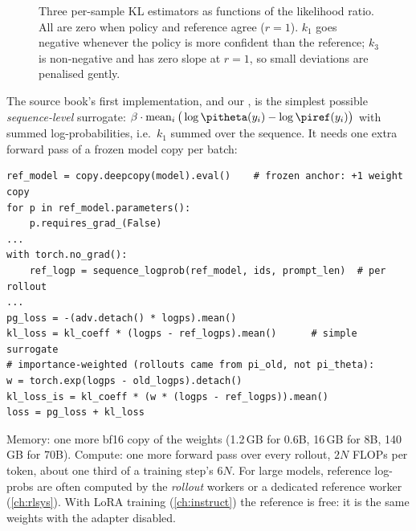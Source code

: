 \begin{figure}[ht]
\centering
{}
\caption{Three per-sample KL estimators as functions of the likelihood ratio. All are zero
when policy and reference agree ($r=1$). $k_1$ goes negative whenever the policy is more
confident than the reference; $k_3$ is non-negative and has zero slope at $r=1$, so small
deviations are penalised gently.}
\label{fig:grpo2:klest}
\end{figure}

The source book's first implementation, and our , is the
simplest possible \emph{sequence-level} surrogate: $\beta\cdot\operatorname{mean}_i\big(\log\pitheta(y_i)-\log\piref(y_i)\big)$
with summed log-probabilities, i.e.\ $k_1$ summed over the sequence. It needs one extra
forward pass of a frozen model copy per batch:

\begin{lstlisting}[caption={Adding a KL term (sequence surrogate and the importance-weighted variant).},label={lst:grpo2:kl}]
ref_model = copy.deepcopy(model).eval()    # frozen anchor: +1 weight copy
for p in ref_model.parameters():
    p.requires_grad_(False)
...
with torch.no_grad():
    ref_logp = sequence_logprob(ref_model, ids, prompt_len)  # per rollout
...
pg_loss = -(adv.detach() * logps).mean()
kl_loss = kl_coeff * (logps - ref_logps).mean()      # simple surrogate
# importance-weighted (rollouts came from pi_old, not pi_theta):
w = torch.exp(logps - old_logps).detach()
kl_loss_is = kl_coeff * (w * (logps - ref_logps)).mean()
loss = pg_loss + kl_loss
\end{lstlisting}

\begin{napkinmath}
Memory: one more bf16 copy of the weights (1.2\,GB for 0.6B, 16\,GB for 8B, 140\,GB for 70B).
Compute: one more forward pass over every rollout, $2N$ FLOPs per token, about one third of a
training step's $6N$. For large models, reference log-probs are often computed by the
\emph{rollout} workers or a dedicated reference worker (\cref{ch:rlsys}). With LoRA training
(\cref{ch:instruct}) the reference is free: it is the same weights with the adapter
disabled.
\end{napkinmath}

